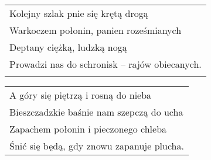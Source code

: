 \documentclass[a5paper]{article}
\begin{document}
\noindent
\begin{tabular}{@{}p{8.00cm}@{}}
Kolejny szlak pnie się krętą drogą \\
Warkoczem połonin, panien roześmianych \\
Deptany ciężką, ludzką nogą \\
Prowadzi nas do schronisk – rajów obiecanych. \\ \\
\end{tabular}

\noindent
\begin{tabular}{@{}p{7.00cm}@{}}
A góry się piętrzą i rosną do nieba \\
Bieszczadzkie baśnie nam szepczą do ucha \\
Zapachem połonin i pieczonego chleba \\
Śnić się będą, gdy znowu zapanuje plucha.
\end{tabular}
\end{document}
